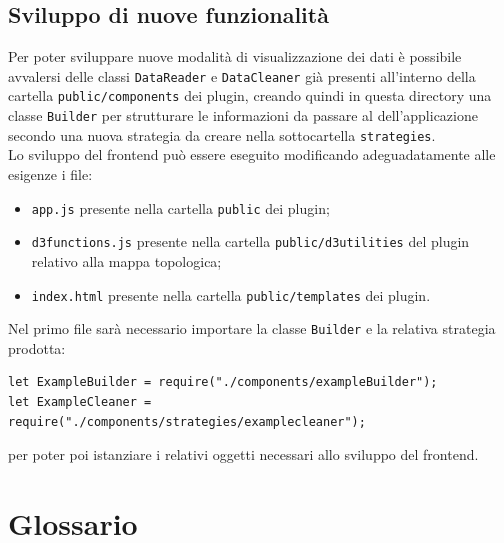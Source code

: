 \subsection{Sviluppo di nuove funzionalità}
\label{sec:nuovefunzionalita}
Per poter sviluppare nuove modalità di visualizzazione dei dati è possibile avvalersi delle classi \texttt{DataReader} e \texttt{DataCleaner} già presenti all'interno della cartella \texttt{public/components} dei plugin, creando quindi in questa directory una classe \texttt{Builder} per strutturare le informazioni da passare al  dell'applicazione secondo una nuova strategia da creare nella sottocartella \texttt{strategies}.\\
Lo sviluppo del frontend può essere eseguito modificando adeguadatamente alle esigenze i file:
\begin{itemize}
	\item \texttt{app.js} presente nella cartella \texttt{public} dei plugin;
	\item \texttt{d3functions.js} presente nella cartella \texttt{public/d3utilities} del plugin relativo alla mappa topologica;
	\item \texttt{index.html} presente nella cartella \texttt{public/templates} dei plugin.
\end{itemize}
Nel primo file sarà necessario importare la classe \texttt{Builder} e la relativa strategia prodotta:
\begin{lstlisting}
let ExampleBuilder = require("./components/exampleBuilder");
let ExampleCleaner = require("./components/strategies/examplecleaner");
\end{lstlisting}
per poter poi istanziare i relativi oggetti necessari allo sviluppo del frontend.



\newpage
\appendix
\section{Glossario}




